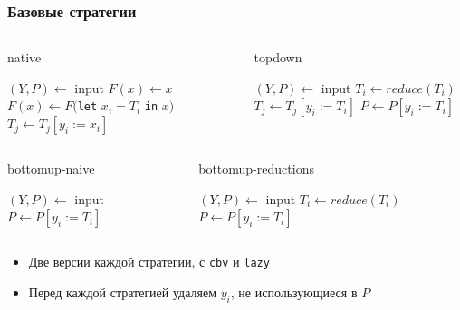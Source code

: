 \documentclass{beamer}
\begin{document}
\begin{frame}\frametitle{Базовые стратегии}
  \begin{columns}
\begin{megaalgorithm}\tiny
    \caption{\tiny native}
  \begin{algorithmic}
    \State $(Y, P)\gets$ input
    \State $F(x) \gets x$
        \State $F(x) \gets F($\texttt{let} $x_i = T_i$ \texttt{in} $x)$
            \State $T_j \gets T_j[y_i := x_i]$
        \EndFor
    \EndFor
    \State {}
  \end{algorithmic}
\end{megaalgorithm}  
  \begin{megaalgorithm}\tiny
    \caption{\tiny topdown}
  \begin{algorithmic}
    \State $(Y, P)\gets$ input
        \State $T_i \gets reduce(T_i)$
            \State $T_j \gets T_j [y_i := T_i]$
        \EndFor
        \State $P \gets P [y_i := T_i]$
    \EndFor
    \State {}
  \end{algorithmic}
\end{megaalgorithm} 
\end{columns}

\begin{columns}
  \begin{megaalgorithm}\tiny
    \caption{\tiny bottomup-naive}
  \begin{algorithmic}
    \State $(Y, P)\gets$ input
        \State $P \gets P [y_i := T_i]$
    \EndFor
    \State {}
  \end{algorithmic}
\end{megaalgorithm}
  \begin{megaalgorithm}\tiny
    \caption{\tiny bottomup-reductions}
  \begin{algorithmic}
    \State $(Y, P)\gets$ input
        \State $T_i \gets reduce(T_i)$
        \State $P \gets P [y_i := T_i]$
    \EndFor
    \State {}
  \end{algorithmic}
\end{megaalgorithm}
\end{columns}
\small
\begin{itemize}
  \item Две версии каждой стратегии, с \texttt{cbv} и \texttt{lazy}
  \item Перед каждой стратегией удаляем $y_i$, не использующиеся в $P$
\end{itemize}
\end{frame}
\end{document}
